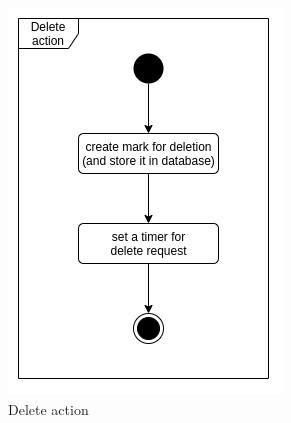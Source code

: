 \begin{figure}\centering
    \begin{minipage}[b]{0.45\textwidth}
    	\includegraphics[width=\textwidth]{pics/undo/delete_action.png}
    	\caption[Delete action]{Delete action}\label{fig:undoDelete}
    \end{minipage}
    \begin{minipage}[b]{0.45\textwidth}

\end{minipage}
\end{figure}
